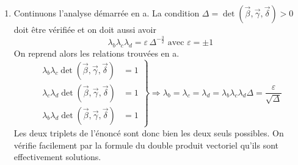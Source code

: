 \begin{enumerate}
\begin{enumerate}
\item Continuons l'analyse démarrée en a.\newline
La condition $\Delta = \det(\overrightarrow{\beta},\overrightarrow{\gamma},\overrightarrow{\delta}) >0$ doit être vérifiée et on doit aussi avoir
\begin{displaymath}
 \lambda_b \lambda_c \lambda_d = \varepsilon\, \Delta^{-\frac{3}{2}} \text{ avec } \varepsilon = \pm 1
\end{displaymath}
On reprend alors les relations trouvées en a.
\begin{displaymath}
  \left. 
\begin{aligned}
\lambda_b \lambda_c \det(\overrightarrow{\beta},\overrightarrow{\gamma},\overrightarrow{\delta}) &=1\\
\lambda_c \lambda_d \det(\overrightarrow{\beta},\overrightarrow{\gamma},\overrightarrow{\delta}) &=1\\
\lambda_b \lambda_d \det(\overrightarrow{\beta},\overrightarrow{\gamma},\overrightarrow{\delta}) &=1
\end{aligned}
\right \rbrace
\Rightarrow
\lambda_b = \lambda_c = \lambda_d = \lambda_b  \lambda_c  \lambda_d \Delta = \frac{\varepsilon}{\sqrt{\Delta}}  
\end{displaymath}
Les deux triplets de l'énoncé sont donc bien les deux seuls possibles.\newline
On vérifie facilement par la formule du double produit vectoriel qu'ils sont effectivement solutions.
\end{enumerate}



\end{enumerate}
